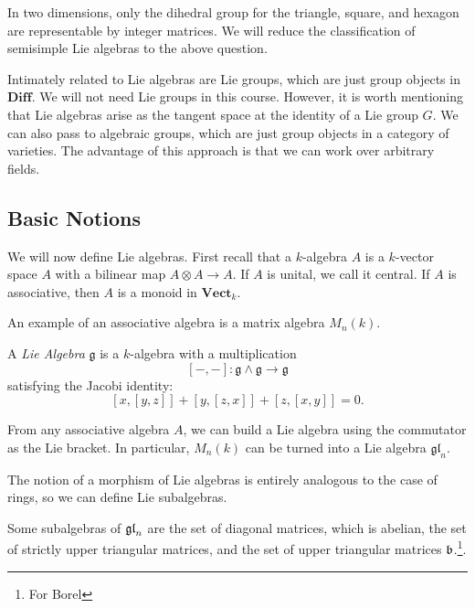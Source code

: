 \documentclass[twoside, 10pt]{article}
\begin{document}
    In two dimensions, only the dihedral group for the triangle, square, and
    hexagon are representable by integer matrices. We will reduce the
    classification of semisimple Lie algebras to the above question.

    Intimately related to Lie algebras are Lie groups, which are just group
    objects in $\mathbf{Diff}$. We will not need Lie groups in this course.
    However, it is worth mentioning that Lie algebras arise as the tangent
    space at the identity of a Lie group $G$. We can also pass to algebraic
    groups, which are just group objects in a category of varieties. The
    advantage of this approach is that we can work over arbitrary fields.

    \subsection{Basic Notions}%
    
    
    We will now define Lie algebras. First recall that a $k$-algebra $A$ is a
    $k$-vector space $A$ with a bilinear map $A \otimes A \to A$. If $A$ is
    unital, we call it central. If $A$ is associative, then $A$ is a monoid in
    $\mathbf{Vect}_k$.

    \begin{exm} An example of an associative algebra is a matrix algebra
    $M_n(k)$.  \end{exm}

    \begin{defn} A \textit{Lie Algebra} $\mathfrak{g}$ is a $k$-algebra with a
        multiplication \[ [-,-]: \mathfrak{g} \wedge \mathfrak{g} \to
            \mathfrak{g} \] satisfying the Jacobi identity: \[ [x,[y,z]] +
        [y,[z,x]] + [z,[x,y]] = 0. \] \end{defn}

    \begin{exm} From any associative algebra $A$, we can build a Lie algebra
    using the commutator as the Lie bracket. In particular, $M_n(k)$ can be
turned into a Lie algebra $\mathfrak{gl}_n$.  \end{exm}

    The notion of a morphism of Lie algebras is entirely analogous to the case
    of rings, so we can define Lie subalgebras.

    \begin{exm} Some subalgebras of $\mathfrak{gl}_n$ are the set of diagonal
    matrices, which is abelian, the set of strictly upper triangular matrices,
and the set of upper triangular matrices $\mathfrak{b}$.\footnote{For Borel}.
\end{exm}
\end{document}
